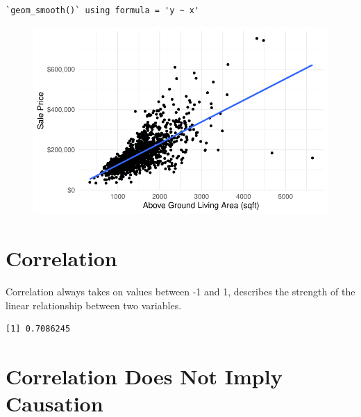 \documentclass[
  letterpaper,
  DIV=11,
  numbers=noendperiod]{scrartcl}
\newenvironment{Shaded}{\begin{snugshade}}{\end{snugshade}}
\newcommand{\FunctionTok}[1]{\textcolor[rgb]{0.28,0.35,0.67}{#1}}
\newcommand{\NormalTok}[1]{\textcolor[rgb]{0.00,0.23,0.31}{#1}}
\newcommand{\SpecialCharTok}[1]{\textcolor[rgb]{0.37,0.37,0.37}{#1}}
\begin{document}
\begin{verbatim}
`geom_smooth()` using formula = 'y ~ x'
\end{verbatim}

\begin{figure}[H]

{\centering \includegraphics{118_M_SLR_Notes_files/figure-pdf/unnamed-chunk-2-1.pdf}

}

\end{figure}

\hypertarget{correlation}{%
\section{Correlation}\label{correlation}}

Correlation always takes on values between -1 and 1, describes the
strength of the linear relationship between two variables.



\begin{Shaded}
\end{Shaded}

\begin{verbatim}
[1] 0.7086245
\end{verbatim}

\hypertarget{correlation-does-not-imply-causation}{%
\section{Correlation Does Not Imply
Causation}\label{correlation-does-not-imply-causation}}
\end{document}
